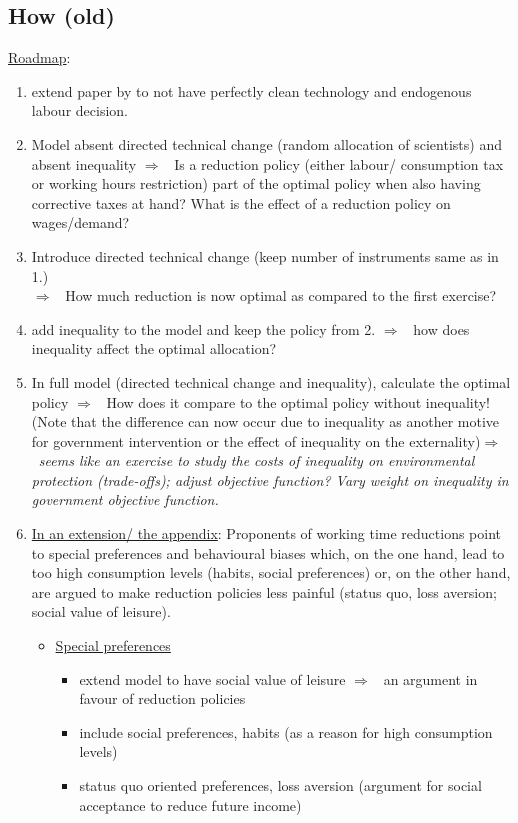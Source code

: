 \documentclass[12pt]{article}
\newcommand{\ar}{$\Rightarrow$ \ }
\begin{document}
\subsection{How (old)}
\underline{Roadmap}: 
\begin{enumerate}
	\item extend paper by \cite{Acemoglu2012TheChange, Fried2018ClimateAnalysis, Acemoglu2016TransitionTechnology} to not have perfectly clean technology and endogenous labour decision.
\item Model absent directed technical change (random allocation of scientists) and absent inequality \ar Is a reduction policy  (either labour/ consumption tax or working hours restriction) part of the optimal policy when also having corrective taxes at hand? What is the effect of a reduction policy on wages/demand? 
\item Introduce directed technical change (keep number of instruments same as in 1.) \\ \ar How much reduction is now optimal as compared to the first exercise?
\item add inequality to the model and keep the policy from 2. \ar how does inequality affect the optimal allocation?
\item In full model (directed technical change and inequality), calculate the optimal policy \ar How does it compare to the optimal policy without inequality! (Note that the difference can now occur due to inequality as another motive for government intervention or the effect of inequality on the externality)\ar \textit{seems like an exercise to study the costs of inequality on environmental protection (trade-offs); adjust objective function? Vary weight on inequality in government objective function. }

\item  \underline{In an extension/ the appendix}:
Proponents of working time reductions point to special preferences and behavioural biases which, on the one hand, lead to too high consumption levels (habits, social preferences) or, on the other hand, are argued to make reduction policies less painful (status quo, loss aversion; social value of leisure). 
\begin{itemize}
	\item \underline{Special preferences}
	\begin{itemize}
		\item extend model to have social value of leisure \ar an argument in favour of reduction policies \citep{Alesina2005WorkDifferent}
		\item include social preferences, habits (as a reason for high consumption levels) \citep{Arrow2004AreMuch, Alvarez-Cuadrado2007EnvyHours, Ravn2006DeepHabits}
		\item status quo oriented preferences, loss aversion \citep{Schor2005SustainableReduction} (argument for social acceptance to reduce future income)
	\end{itemize}
\end{itemize}


\end{enumerate}
\end{document}
